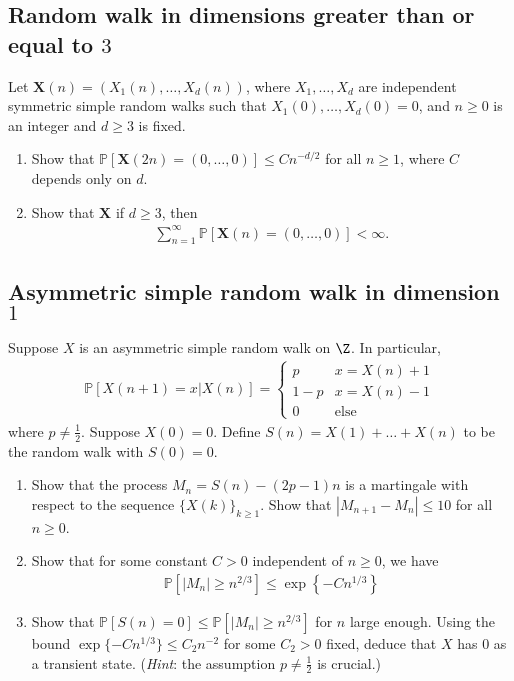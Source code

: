 \documentclass[12pt,reqno]{amsart}
\theoremstyle{definition}
\theoremstyle{remark}
\numberwithin{equation}{section}
\begin{document}
\subsection{Random walk in dimensions greater than or equal to $3$}
Let $\mathbf{X}(n)=(X_{1}(n),\ldots,X_{d}(n))$, where $X_{1},\ldots,X_{d}$ are independent symmetric simple random walks such that $X_{1}(0),\ldots,X_{d}(0)=0$, and $n\geq0$ is an integer and $d\geq3$ is fixed.
\begin{enumerate}
\item Show that $\mathbb{P}[\mathbf{X}(2n)=(0,\ldots,0)]\leq Cn^{-d/2}$ for all $n\geq1$, where $C$ depends only on $d$.
\item Show that $\mathbf{X}$ if $d\geq3$, then 
%
\begin{align*}
\sum_{n=1}^{\infty}\mathbb{P}[\mathbf{X}(n)=(0,\ldots,0)]<\infty.
\end{align*}
%
\end{enumerate}
\subsection{Asymmetric simple random walk in dimension $1$}
Suppose $X$ is an asymmetric simple random walk on $\Z$. In particular, 
%
\begin{align*}
\mathbb{P}[X(n+1)=x|X(n)]=\begin{cases}p&x=X(n)+1\\1-p&x=X(n)-1\\0&\mathrm{else}\end{cases}
\end{align*}
%
where $p\neq\frac12$. Suppose $X(0)=0$. Define $S(n)=X(1)+\ldots+X(n)$ to be the random walk with $S(0)=0$.
\begin{enumerate}
\item Show that the process $M_{n}=S(n)-(2p-1)n$ is a martingale with respect to the sequence $\{X(k)\}_{k\geq1}$. Show that $|M_{n+1}-M_{n}|\leq 10$ for all $n\geq0$.
\item Show that for some constant $C>0$ independent of $n\geq0$, we have
%
\begin{align*}
\mathbb{P}\left[|M_{n}|\geq n^{2/3}\right]\leq \exp\left\{-Cn^{1/3}\right\}
\end{align*}
%
\item Show that $\mathbb{P}[S(n)=0]\leq\mathbb{P}[|M_{n}|\geq n^{2/3}]$ for $n$ large enough. Using the bound $\exp\{-Cn^{1/3}\}\leq C_{2}n^{-2}$ for some $C_{2}>0$ fixed, deduce that $X$ has $0$ as a transient state. (\emph{Hint}: the assumption $p\neq\frac12$ is crucial.)
\end{enumerate}
\end{document}
